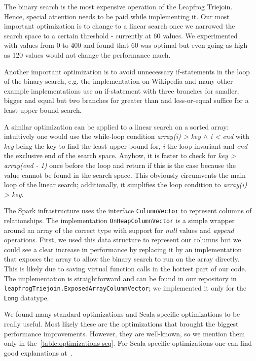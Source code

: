 The binary search is the most expensive operation of the Leapfrog Triejoin.
Hence, special attention needs to be paid while implementing it.
Our most important optimization is to change to a linear search once we narrowed the search space
to a certain threshold - currently at 60 values.
We experimented with values from 0 to 400 and found that 60 was optimal but even going as high as 120 values would not change the performance much.

Another important optimization is to avoid unnecessary if-statements in the loop of the binary
search, e.g. the implementation on Wikipedia and many other example implementations use an
if-statement with three branches for smaller, bigger and equal but two branches for greater than and less-or-equal suffice for a least upper bound search.

A similar optimization can be applied to a linear search on a sorted array: intuitively one would use the while-loop condition
\textit{array(i) > key $\wedge$ i < end} with \textit{key} being the key to find the least upper bound for, \textit{i} the loop invariant
and \textit{end} the exclusive end of the search space.
Anyhow, it is faster to check for \textit{key > array(end - 1)} once before the loop and return if this is the case because the value
cannot be found in the search space.
This obviously circumvents the main loop of the linear search;
additionally, it simplifies the loop condition to \textit{array(i) > key}.

The Spark infrastructure uses the interface \texttt{ColumnVector} to represent columns of relationships.
The implementation \texttt{OnHeapColumnVector} is a simple wrapper around an array of the correct type with support for \textit{null} values and \textit{append} operations.
First, we used this data structure to represent our columns but we could see a clear increase in performance by replacing it by an implementation that exposes the array
to allow the binary search to run on the array directly.
This is likely due to saving virtual function calls in the hottest part of our code.
The implementation is straightforward and can be found in our repository in \texttt{leapfrogTriejoin.ExposedArrayColumnVector}; we implemented it only for the \texttt{Long} datatype.

We found many standard optimizations and Scala specific optimizations to be really useful.
Most likely these are the optimizations that brought the biggest performance improvements.
However, they are well-known, so we mention them only in the~\cref{table:optimizations-seq}.
For Scala specific optimizations one can find good explanations at~\cite{databricks-scala-guide}.

